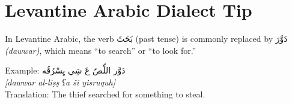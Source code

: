 \documentclass[a4paper,12pt]{article}
\begin{document}
\section{Levantine Arabic Dialect Tip}

In Levantine Arabic, the verb \textarabic{بَحَثَ} (past tense) is commonly replaced by \textarabic{دَوَّرَ} \textit{(dawwar)}, which means “to search” or “to look for.”

Example: \textarabic{دَوَّر اللِّصّ عَ شِي يِسْرُقُه} \\
\textit{[dawwar al-liṣṣ ʕa ši yisruquh]} \\
Translation: The thief searched for something to steal.
\end{document}
